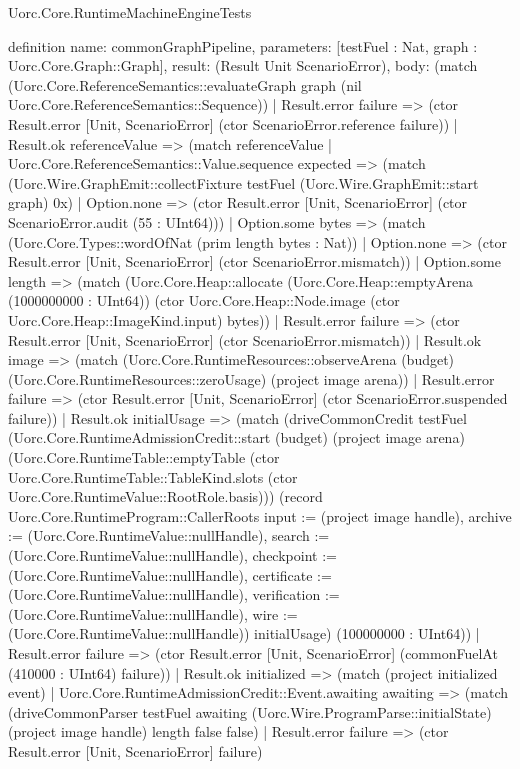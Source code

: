 \begin{lexlean}{Uorc.Core.RuntimeMachineEngineTests}
\begin{semanticmodule}
definition{
  name: commonGraphPipeline,
  parameters: [testFuel : Nat, graph : Uorc.Core.Graph::Graph],
  result: (Result Unit ScenarioError),
  body: (match (Uorc.Core.ReferenceSemantics::evaluateGraph graph (nil Uorc.Core.ReferenceSemantics::Sequence))
    | Result.error failure => (ctor Result.error [Unit, ScenarioError] (ctor ScenarioError.reference failure))
    | Result.ok referenceValue => (match referenceValue
      | Uorc.Core.ReferenceSemantics::Value.sequence expected => (match (Uorc.Wire.GraphEmit::collectFixture testFuel (Uorc.Wire.GraphEmit::start graph) 0x)
        | Option.none => (ctor Result.error [Unit, ScenarioError] (ctor ScenarioError.audit (55 : UInt64)))
        | Option.some bytes => (match (Uorc.Core.Types::wordOfNat (prim length bytes : Nat))
          | Option.none => (ctor Result.error [Unit, ScenarioError] (ctor ScenarioError.mismatch))
          | Option.some length => (match (Uorc.Core.Heap::allocate (Uorc.Core.Heap::emptyArena (1000000000 : UInt64)) (ctor Uorc.Core.Heap::Node.image (ctor Uorc.Core.Heap::ImageKind.input) bytes))
            | Result.error failure => (ctor Result.error [Unit, ScenarioError] (ctor ScenarioError.mismatch))
            | Result.ok image => (match (Uorc.Core.RuntimeResources::observeArena (budget) (Uorc.Core.RuntimeResources::zeroUsage) (project image arena))
              | Result.error failure => (ctor Result.error [Unit, ScenarioError] (ctor ScenarioError.suspended failure))
              | Result.ok initialUsage => (match (driveCommonCredit testFuel (Uorc.Core.RuntimeAdmissionCredit::start (budget) (project image arena) (Uorc.Core.RuntimeTable::emptyTable (ctor Uorc.Core.RuntimeTable::TableKind.slots (ctor Uorc.Core.RuntimeValue::RootRole.basis))) (record Uorc.Core.RuntimeProgram::CallerRoots {input := (project image handle), archive := (Uorc.Core.RuntimeValue::nullHandle), search := (Uorc.Core.RuntimeValue::nullHandle), checkpoint := (Uorc.Core.RuntimeValue::nullHandle), certificate := (Uorc.Core.RuntimeValue::nullHandle), verification := (Uorc.Core.RuntimeValue::nullHandle), wire := (Uorc.Core.RuntimeValue::nullHandle)}) initialUsage) (100000000 : UInt64))
                | Result.error failure => (ctor Result.error [Unit, ScenarioError] (commonFuelAt (410000 : UInt64) failure))
                | Result.ok initialized => (match (project initialized event)
                  | Uorc.Core.RuntimeAdmissionCredit::Event.awaiting awaiting => (match (driveCommonParser testFuel awaiting (Uorc.Wire.ProgramParse::initialState) (project image handle) length false false)
                    | Result.error failure => (ctor Result.error [Unit, ScenarioError] failure)
}
\end{semanticmodule}
\end{lexlean}
